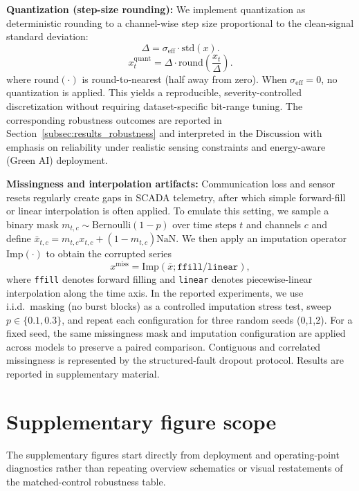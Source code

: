 \documentclass[review,1p,times]{elsarticle}
\begin{document}
\noindent\textbf{Quantization (step-size rounding):}
We implement quantization as deterministic rounding to a channel-wise step size proportional to the clean-signal standard deviation:
\begin{equation}
\Delta = \sigma_{\mathrm{eff}}\cdot \mathrm{std}(x).
\end{equation}
\begin{equation}
x^{\text{quant}}_t = \Delta\cdot \mathrm{round}\!\left(\frac{x_t}{\Delta}\right).
\end{equation}
where $\mathrm{round}(\cdot)$ is round-to-nearest (half away from zero). When $\sigma_{\mathrm{eff}}=0$, no quantization is applied. This yields a reproducible, severity-controlled discretization without requiring dataset-specific bit-range tuning. The corresponding robustness outcomes are reported in Section~\ref{subsec:results_robustness} and interpreted in the Discussion with emphasis on reliability under realistic sensing constraints and energy-aware (Green AI) deployment.



\noindent\textbf{Missingness and interpolation artifacts:}
Communication loss and sensor resets regularly create gaps in SCADA telemetry, after which simple forward-fill or linear interpolation is often applied. To emulate this setting, we sample a binary mask $m_{t,c}\sim\mathrm{Bernoulli}(1-p)$ over time steps $t$ and channels $c$ and define $\bar{x}_{t,c}=m_{t,c}x_{t,c}+(1-m_{t,c})\mathrm{NaN}$. We then apply an imputation operator $\mathrm{Imp}(\cdot)$ to obtain the corrupted series
\begin{equation}
x^{\text{miss}}=\mathrm{Imp}(\bar{x};\texttt{ffill/linear}),
\end{equation}
where \texttt{ffill} denotes forward filling and \texttt{linear} denotes piecewise-linear interpolation along the time axis. In the reported experiments, we use i.i.d.\ masking (no burst blocks) as a controlled imputation stress test, sweep $p\in\{0.1,0.3\}$, and repeat each configuration for three random seeds (0,1,2). For a fixed seed, the same missingness mask and imputation configuration are applied across models to preserve a paired comparison. Contiguous and correlated missingness is represented by the structured-fault dropout protocol. Results are reported in supplementary material.

\section{Supplementary figure scope}\label{app:supp_overview_figs}
The supplementary figures start directly from deployment and operating-point diagnostics rather than repeating overview schematics or visual restatements of the matched-control robustness table.
\end{document}
